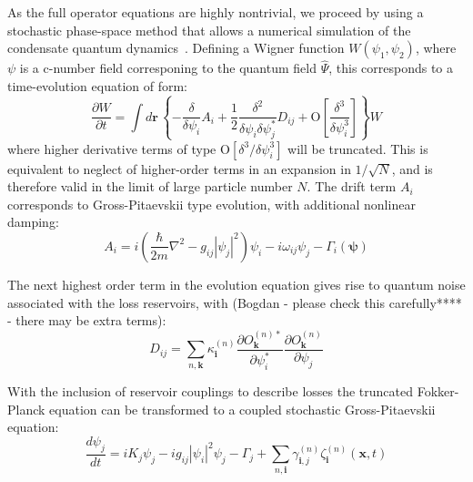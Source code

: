 \documentclass[aps,prl,twocolumn,showpacs,amsmath,amssymb,superscriptaddress]{revtex4-1}
\begin{document}
As the full operator equations are highly nontrivial,
we proceed by using a stochastic phase-space method
that allows a numerical simulation of the condensate quantum dynamics~\cite{Drummond1993, Steel1998}.
Defining a Wigner function $W\left(\psi_{1},\psi_{2}\right)$,
where $\psi$ is a c-number field corresponing to the quantum field $\hat{\Psi}$,
this corresponds to a time-evolution equation of form:
\begin{equation}
	\frac{\partial W}{\partial t} = \int d\mathbf{r}\,\left\{
		-\frac{\delta}{\delta\psi_{i}} A_{i} +
		\frac{1}{2} \frac{\delta^{2}}{\delta\psi_{i} \delta\psi_{j}^{*}}D_{ij} +
		\mbox{O} \left[ \frac{\delta^{3}}{\delta\psi_{i}^{3}} \right]
	\right\} W
\end{equation}
where higher derivative terms of type $\mbox{O}\left[\delta^{3}/\delta\psi_{i}^{3}\right]$
will be truncated.
This is equivalent to neglect of higher-order terms in an expansion in $1/\sqrt{N}$,
and is therefore valid in the limit of large particle number $N$.
The drift term $A_{i}$ corresponds to Gross-Pitaevskii type evolution,
with additional nonlinear damping:
\begin{equation}
	A_{i} = i \left(
	 	\frac{\hbar}{2m} \nabla^{2}-g_{ij} \left| \psi_{j} \right|^{2}
	\right) \psi_{i} - i \omega_{ij} \psi_{j} - \Gamma_{i} \left( \boldsymbol{\psi} \right)
\end{equation}

The next highest order term in the evolution equation gives rise to
quantum noise associated with the loss reservoirs,
with (Bogdan - please check this carefully{*}{*}{*}{*} - there may be extra terms):
\begin{equation}
	D_{ij} = \sum_{n,\mathbf{k}} \kappa_{\mathbf{i}}^{(n)}
	\frac{\partial O_{\mathbf{k}}^{(n)*}}{\partial\psi_{i}^{*}}
	\frac{\partial O_{\mathbf{k}}^{(n)}}{\partial\psi_{j}}
\end{equation}

With the inclusion of reservoir couplings to describe losses
the truncated Fokker-Planck equation can be transformed
to a coupled stochastic Gross-Pitaevskii equation:
\begin{equation}
	\frac{d\psi_{j}}{dt} = iK_{j} \psi_{j} - ig_{ij} |\psi_{i}|^{2} \psi_{j} - \Gamma_{j} +
		\sum_{n,\mathbf{i}} \gamma_{\mathbf{i},j}^{(n)} \zeta_{\mathbf{i}}^{(n)} (\mathbf{x},t)
\end{equation}
\end{document}

